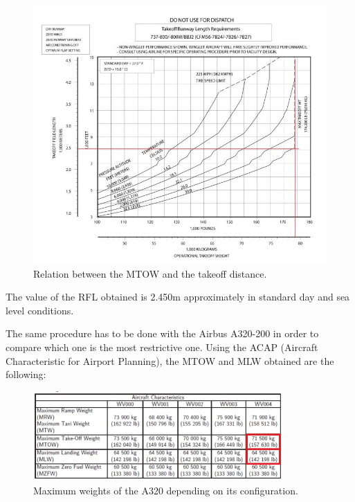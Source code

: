 		\begin{figure}[H]
			\centering
			\includegraphics[clip, trim=0cm 0cm 0cm 0cm, width=1\textwidth]{./images/B737/takeoff-weight737}
			\caption{Relation between the MTOW and the takeoff distance.} %
			\label{} %
		\end{figure}
	
		The value of the RFL obtained is 2.450m approximately in standard day and sea level conditions. 
		
		The same procedure has to be done with the Airbus A320-200 in order to compare which one is the most restrictive one. Using the ACAP (Aircraft Characteristic for Airport Planning), the MTOW and MLW obtained are the following:
		
		\begin{figure}[H]
			\centering
			\includegraphics[clip, trim=0cm 0cm 0cm 0cm, width=0.85\textwidth]{./images/A320/A320MTOW}
			\caption{Maximum weights of the A320 depending on its configuration.} %
			\label{} %
		\end{figure}
	
